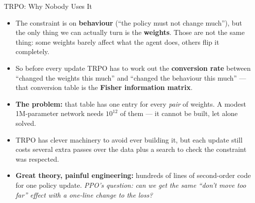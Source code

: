 \begin{frame}{TRPO: Why Nobody Uses It}
\begin{itemize}
    \setlength{\itemsep}{0.7em}
    \item The constraint is on \textbf{behaviour} (``the policy must not change much''), but the only thing we can actually turn is the \textbf{weights}. Those are not the same thing: some weights barely affect what the agent does, others flip it completely.
    \item So before every update TRPO has to work out the \textbf{conversion rate} between ``changed the weights this much'' and ``changed the behaviour this much'' --- that conversion table is the \textbf{Fisher information matrix}.
    \pause
    \item \textbf{The problem:} that table has one entry for every \emph{pair} of weights. A modest 1M-parameter network needs $10^{12}$ of them --- it cannot be built, let alone solved.
    \item TRPO has clever machinery to avoid ever building it, but each update still costs several extra passes over the data plus a search to check the constraint was respected.
    \pause
    \item[$\Rightarrow$] \textbf{Great theory, painful engineering:} hundreds of lines of second-order code for one policy update. \emph{PPO's question: can we get the same ``don't move too far'' effect with a one-line change to the loss?}
\end{itemize}
\end{frame}

